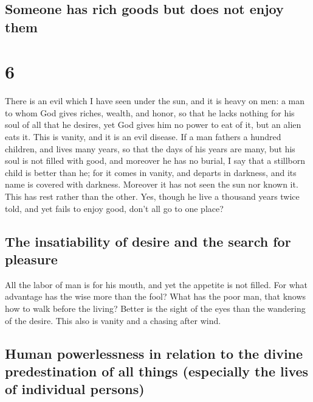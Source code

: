 \hypertarget{someone-has-rich-goods-but-does-not-enjoy-them}{%
\subsection{Someone has rich goods but does not enjoy
them}\label{someone-has-rich-goods-but-does-not-enjoy-them}}

\hypertarget{section-5}{%
\section{6}\label{section-5}}

 There is an evil which I have seen under the sun, and it
is heavy on men:  a man to whom God gives riches, wealth,
and honor, so that he lacks nothing for his soul of all that he desires,
yet God gives him no power to eat of it, but an alien eats it. This is
vanity, and it is an evil disease.  If a man fathers a
hundred children, and lives many years, so that the days of his years
are many, but his soul is not filled with good, and moreover he has no
burial, I say that a stillborn child is better than he; 
for it comes in vanity, and departs in darkness, and its name is covered
with darkness.  Moreover it has not seen the sun nor known
it. This has rest rather than the other.  Yes, though he
live a thousand years twice told, and yet fails to enjoy good, don't all
go to one place?

\hypertarget{the-insatiability-of-desire-and-the-search-for-pleasure}{%
\subsection{The insatiability of desire and the search for
pleasure}\label{the-insatiability-of-desire-and-the-search-for-pleasure}}

 All the labor of man is for his mouth, and yet the
appetite is not filled.  For what advantage has the wise
more than the fool? What has the poor man, that knows how to walk before
the living?  Better is the sight of the eyes than the
wandering of the desire. This also is vanity and a chasing after wind.

\hypertarget{human-powerlessness-in-relation-to-the-divine-predestination-of-all-things-especially-the-lives-of-individual-persons}{%
\subsection{Human powerlessness in relation to the divine predestination
of all things (especially the lives of individual
persons)}\label{human-powerlessness-in-relation-to-the-divine-predestination-of-all-things-especially-the-lives-of-individual-persons}}

